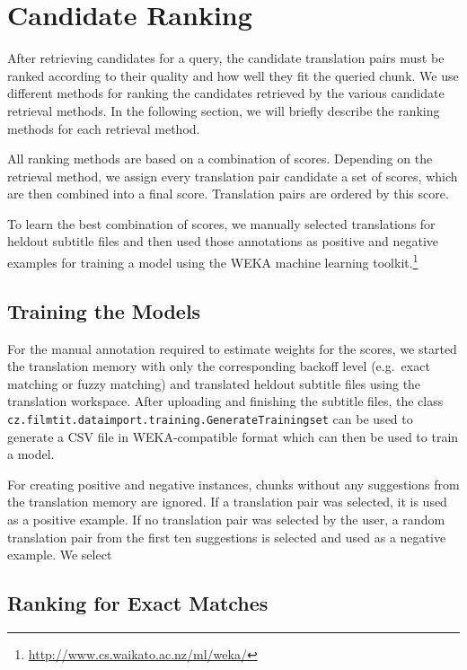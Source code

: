\section{Candidate Ranking}
\label{sec:ranking}

After retrieving candidates for a query, the candidate translation pairs must be ranked according to their quality and how well they fit the queried chunk. We use different methods for ranking the candidates retrieved by the various candidate retrieval methods. In the following section, we will briefly describe the ranking methods for each retrieval method.

All ranking methods are based on a combination of scores. Depending on the retrieval method, we assign every translation pair candidate a set of scores, which are then combined into a final score. Translation pairs are ordered by this score.

To learn the best combination of scores, we manually selected translations for heldout subtitle files and then used those annotations as positive and negative examples for training a model using the WEKA machine learning toolkit.\footnote{\url{http://www.cs.waikato.ac.nz/ml/weka/}}

\subsection{Training the Models}

For the manual annotation required to estimate weights for the scores, we started the translation memory with only the corresponding backoff level (e.g.\ exact matching or fuzzy matching) and translated heldout subtitle files using the translation workspace. After uploading and finishing the subtitle files, the class {\tt cz.filmtit.dataimport.training.GenerateTrainingset} can be used to generate a CSV file in WEKA-compatible format which can then be used to train a model.

For creating positive and negative instances, chunks without any suggestions from the translation memory are ignored. If a translation pair was selected, it is used as a positive example. If no translation pair was selected by the user, a random translation pair from the first ten suggestions is selected and used as a negative example. We select 


\subsection{Ranking for Exact Matches}


